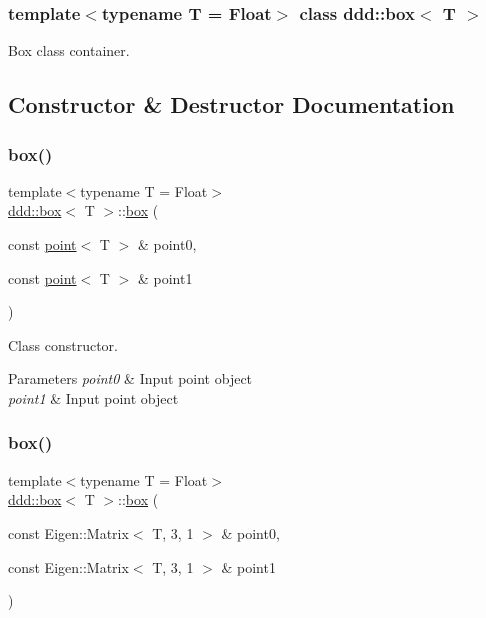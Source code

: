 \subsubsection*{template$<$typename T = Float$>$\newline
class ddd\+::box$<$ T $>$}

Box class container. 

\subsection{Constructor \& Destructor Documentation}
\mbox{\label{classddd_1_1box_a5af6ee4453ac4d80b9bb1ac858d253ac}} 
\subsubsection{\texorpdfstring{box()}{box()}\hspace{0.1cm}{\footnotesize\ttfamily [1/2]}}
{\footnotesize\ttfamily template$<$typename T = Float$>$ \\
\hyperlink{classddd_1_1box}{ddd\+::box}$<$ T $>$\+::\hyperlink{classddd_1_1box}{box} (\begin{DoxyParamCaption}\item[{const \hyperlink{classddd_1_1point}{point}$<$ T $>$ \&}]{point0,  }\item[{const \hyperlink{classddd_1_1point}{point}$<$ T $>$ \&}]{point1 }\end{DoxyParamCaption})\hspace{0.3cm}{\ttfamily [inline]}}



Class constructor. 


\begin{DoxyParams}{Parameters}
{\em point0} & Input point object \\
\hline
{\em point1} & Input point object \\
\hline
\end{DoxyParams}
\mbox{\label{classddd_1_1box_ae1130e95b0dc6c43c4a805de9f5aed87}} 
\subsubsection{\texorpdfstring{box()}{box()}\hspace{0.1cm}{\footnotesize\ttfamily [2/2]}}
{\footnotesize\ttfamily template$<$typename T = Float$>$ \\
\hyperlink{classddd_1_1box}{ddd\+::box}$<$ T $>$\+::\hyperlink{classddd_1_1box}{box} (\begin{DoxyParamCaption}\item[{const Eigen\+::\+Matrix$<$ T, 3, 1 $>$ \&}]{point0,  }\item[{const Eigen\+::\+Matrix$<$ T, 3, 1 $>$ \&}]{point1 }\end{DoxyParamCaption})\hspace{0.3cm}{\ttfamily [inline]}}



